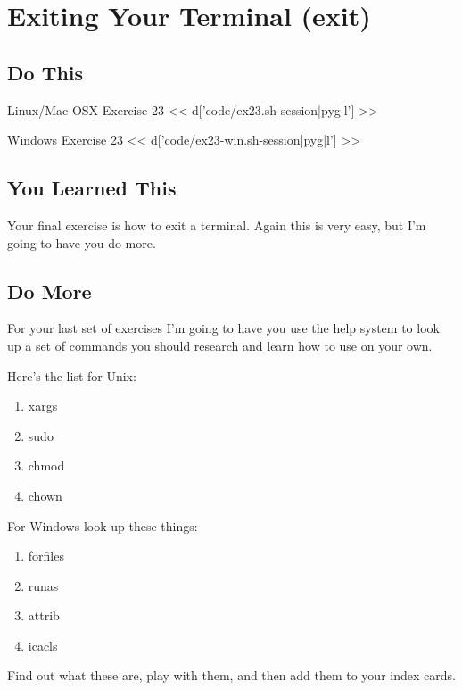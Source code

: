 \chapter{Exiting Your Terminal (exit)}

\section{Do This}

\begin{code}{Linux/Mac OSX Exercise 23}
<< d['code/ex23.sh-session|pyg|l'] >>
\end{code}

\begin{code}{Windows Exercise 23}
<< d['code/ex23-win.sh-session|pyg|l'] >>
\end{code}

\section{You Learned This}

Your final exercise is how to exit a terminal.  Again this is very easy, but
I'm going to have you do more.

\section{Do More}

For your last set of exercises I'm going to have you use the help system to look up
a set of commands you should research and learn how to use on your own.

Here's the list for Unix:

\begin{enumerate}
\item xargs
\item sudo
\item chmod
\item chown
\end{enumerate}


For Windows look up these things:

\begin{enumerate}
\item forfiles
\item runas
\item attrib
\item icacls
\end{enumerate}

Find out what these are, play with them, and then add them to your index cards.
